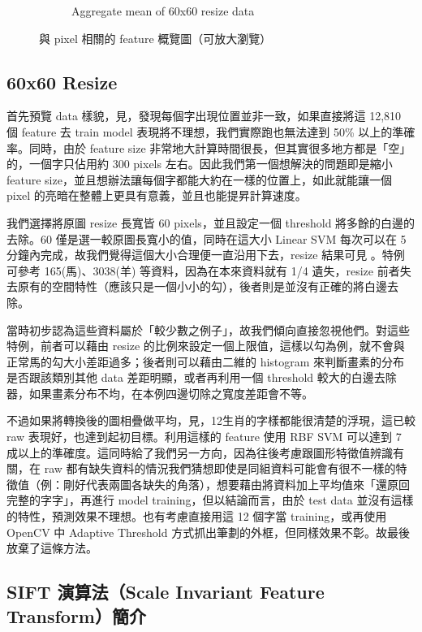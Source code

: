 \begin{figure}[htb]
\begin{subfigure}[b]{0.98\textwidth}
        \caption{Aggregate mean of 60x60 resize data}
        \label{fig:px-60-mean}
    \end{subfigure}
    \caption{與 pixel 相關的 feature 概覽圖（可放大瀏覽）}\label{fig:px-overview}
\end{figure}

\subsection*{60x60 Resize}
首先預覽 data 樣貌，見，發現每個字出現位置並非一致，如果直接將這 12,810 個 feature 去 train model 表現將不理想，我們實際跑也無法達到 50\% 以上的準確率。同時，由於 feature size 非常地大計算時間很長，但其實很多地方都是「空」的，一個字只佔用約 300 pixels 左右。因此我們第一個想解決的問題即是縮小 feature size，並且想辦法讓每個字都能大約在一樣的位置上，如此就能讓一個 pixel 的亮暗在整體上更具有意義，並且也能提昇計算速度。

我們選擇將原圖 resize 長寬皆 60 pixels，並且設定一個 threshold 將多餘的白邊的去除。60 僅是選一較原圖長寬小的值，同時在這大小 Linear SVM 每次可以在 5 分鐘內完成，故我們覺得這個大小合理便一直沿用下去，resize 結果可見 。特例可參考 165(馬)、3038(羊) 等資料，因為在本來資料就有 1/4 遺失，resize 前者失去原有的空間特性（應該只是一個小小的勾），後者則是並沒有正確的將白邊去除。

當時初步認為這些資料屬於「較少數之例子」，故我們傾向直接忽視他們。對這些特例，前者可以藉由 resize 的比例來設定一個上限值，這樣以勾為例，就不會與正常馬的勾大小差距過多；後者則可以藉由二維的 histogram 來判斷畫素的分布是否跟該類別其他 data 差距明顯，或者再利用一個 threshold 較大的白邊去除器，如果畫素分布不均，在本例四邊切除之寬度差距會不等。

不過如果將轉換後的圖相疊做平均，見，12生肖的字樣都能很清楚的浮現，這已較 raw 表現好，也達到起初目標。利用這樣的 feature 使用 RBF SVM 可以達到 7 成以上的準確度。這同時給了我們另一方向，因為往後考慮跟圖形特徵值辨識有關，在 raw 都有缺失資料的情況我們猜想即使是同組資料可能會有很不一樣的特徵值（例：剛好代表兩圖各缺失的角落），想要藉由將資料加上平均值來「還原回完整的字字」，再進行 model training，但以結論而言，由於 test data 並沒有這樣的特性，預測效果不理想。也有考慮直接用這 12 個字當 training，或再使用 OpenCV 中 Adaptive Threshold 方式抓出筆劃的外框，但同樣效果不彰。故最後放棄了這條方法。

\subsection*{SIFT 演算法（Scale Invariant Feature Transform）簡介}

